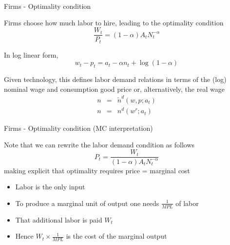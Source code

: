 

\begin{frame}{Firms - Optimality condition}

Firms choose how much labor to hire, leading to the optimality condition
\[
\frac{W_{t}}{P_{t}} = \left( 1 - \alpha \right) A_{t} N_{t}^{-\alpha}
\]

In log linear form,
\[
w_{t} - p_{t} = a_{t} - \alpha n_{t} + \log{\left( 1 - \alpha \right)}
\]

Given technology, this defines labor demand relations in terms of the (log) nominal wage and consumption good price or, alternatively, the real wage
\begin{eqnarray*}
n &=& \tilde{n}^{d}\left(w,p; a_{t}\right) \\
n &=& n^{d}\left(w^{r}; a_{t}\right)
\end{eqnarray*}

\end{frame}



\begin{frame}{Firms - Optimality condition (MC interpretation)}

Note that we can rewrite the labor demand condition as follows
\[
P_{t} = \frac{W_{t}}{\left( 1 - \alpha \right) A_{t} N_{t}^{-\alpha}}
\]
making explicit that optimality requires price = marginal cost

\vspace{2mm}
\begin{itemize}
\item	Labor is the only input
\item	To produce a marginal unit of output one needs $\frac{1}{MPL}$ of labor
\item	That additional labor is paid $W_{t}$
\item	Hence $W_{t} \times \frac{1}{MPL}$ is the cost of the marginal output
\end{itemize}

\end{frame}

